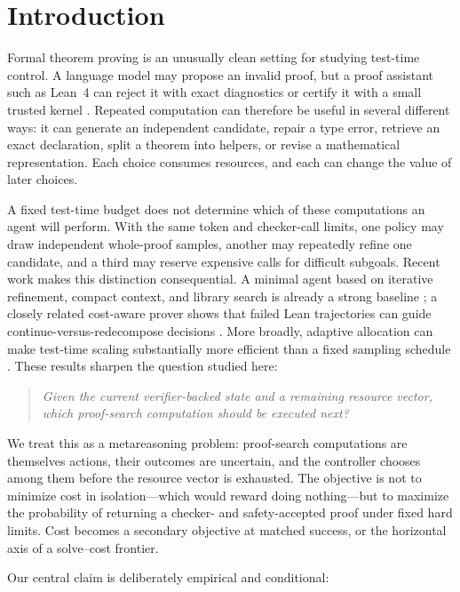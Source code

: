 \section{Introduction}

Formal theorem proving is an unusually clean setting for studying test-time
control. A language model may propose an invalid proof, but a proof assistant
such as Lean~4 can reject it with exact diagnostics or certify it with a small
trusted kernel \cite{demoura2021lean4}. Repeated computation can therefore be
useful in several different ways: it can generate an independent candidate,
repair a type error, retrieve an exact declaration, split a theorem into
helpers, or revise a mathematical representation. Each choice consumes
resources, and each can change the value of later choices.

A fixed test-time budget does not determine which of these computations an
agent will perform. With the same token and checker-call limits, one policy may
draw independent whole-proof samples, another may repeatedly refine one
candidate, and a third may reserve expensive calls for difficult subgoals.
Recent work makes this distinction consequential. A minimal agent based on
iterative refinement, compact context, and library search is already a strong
baseline \cite{requena2026minimal}; a closely related cost-aware prover shows
that failed Lean trajectories can guide continue-versus-redecompose decisions
\cite{rognvaldsson2026costquality}. More broadly, adaptive allocation can make
test-time scaling substantially more efficient than a fixed sampling schedule
\cite{snell2025scaling}. These results sharpen the question studied here:

\begin{quote}
\emph{Given the current verifier-backed state and a remaining resource vector,
which proof-search computation should be executed next?}
\end{quote}

We treat this as a metareasoning problem: proof-search computations are
themselves actions, their outcomes are uncertain, and the controller chooses
among them before the resource vector is exhausted. The objective is not to
minimize cost in isolation---which would reward doing nothing---but to maximize
the probability of returning a checker- and safety-accepted proof under fixed
hard limits. Cost becomes a secondary objective at matched success, or the
horizontal axis of a solve--cost frontier.

Our central claim is deliberately empirical and conditional:


